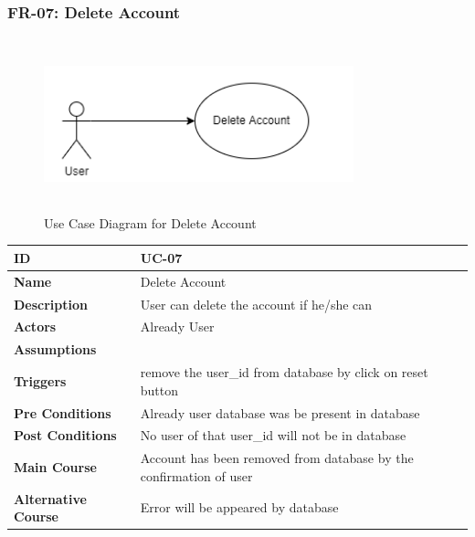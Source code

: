     \subsubsection{FR-07: Delete Account}
    \begin{figure}[H]
        \includegraphics[height=5cm, width=0.8\textwidth]{./diagrams/Use Case/u7.png}
        \centering 
        \caption{Use Case Diagram for Delete Account}
        \label{fig:Usecase1}
        \end{figure}
        
    \begin{center}
        \begin{tabularx}{\textwidth}{|l|X|}
            \hline
            \textbf{ID} & UC-07 \\
            \hline
            \textbf{Name} & Delete Account \\
            \hline
            \textbf{Description} & User can delete the account if he/she can \\
            \hline
            \textbf{Actors} & Already User \\
            \hline
            \textbf{Assumptions} &  \\
            \hline
            \textbf{Triggers} & remove the user\_id from database by click on reset button \\
            \hline
            \textbf{Pre Conditions} & Already user database was be present in database \\
            \hline
            \textbf{Post Conditions} & No user of that user\_id will not be in database \\
            \hline
            \textbf{Main Course} & Account has been removed from database by the confirmation of user \\
            \hline
            \textbf{Alternative Course} & Error will be appeared by database \\
            \hline
            
        \end{tabularx}
    \end{center}
    \newpage
    

